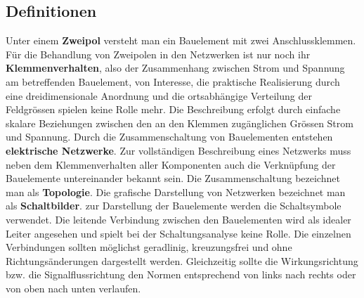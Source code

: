 \subsection{Definitionen}
Unter einem \textbf{Zweipol} versteht man ein Bauelement mit zwei Anschlussklemmen. Für die Behandlung von Zweipolen in den Netzwerken ist nur noch ihr \textbf{Klemmenverhalten}, also der Zusammenhang zwischen Strom und Spannung am betreffenden Bauelement, von Interesse, die praktische Realisierung durch eine dreidimensionale Anordnung und die ortsabhängige Verteilung der Feldgrössen spielen keine Rolle mehr. Die Beschreibung erfolgt durch einfache skalare Beziehungen zwischen den an den Klemmen zugänglichen Grössen Strom und Spannung.
\newline\newline
Durch die Zusammenschaltung von Bauelementen entstehen \textbf{elektrische Netzwerke}. Zur vollständigen Beschreibung eines Netzwerks muss neben dem Klemmenverhalten aller Komponenten auch die Verknüpfung der Bauelemente untereinander bekannt sein. Die Zusammenschaltung bezeichnet man als \textbf{Topologie}.
\newline\newline
Die grafische Darstellung von Netzwerken bezeichnet man als \textbf{Schaltbilder}. zur Darstellung der Bauelemente werden die Schaltsymbole verwendet. Die leitende Verbindung zwischen den Bauelementen wird als idealer Leiter angesehen und spielt bei der Schaltungsanalyse keine Rolle. Die einzelnen Verbindungen sollten möglichst geradlinig, kreuzungsfrei und ohne Richtungsänderungen dargestellt werden. Gleichzeitig sollte die Wirkungsrichtung bzw. die Signalflussrichtung den Normen entsprechend von links nach rechts oder von oben nach unten verlaufen.
